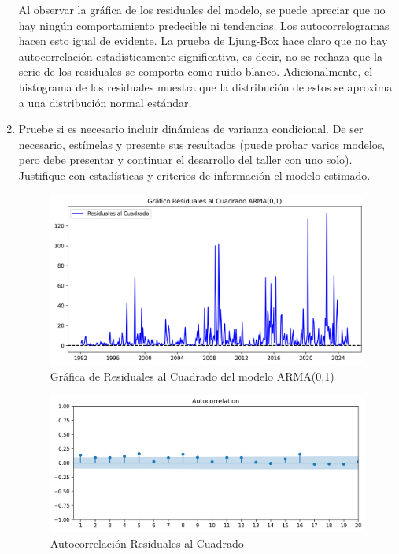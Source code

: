 \documentclass{article}
\theoremstyle{remark}
\theoremstyle{definition}
\begin{document}
\begin{enumerate}[label = \emph{\alph*})]
\begin{tcolorbox}[title=Soluci\'on 2.e]
Al observar la gráfica de los residuales del modelo, se puede apreciar que no hay ningún comportamiento predecible  ni tendencias. Los autocorrelogramas hacen esto igual de evidente. La prueba de Ljung-Box hace claro que no hay autocorrelación estadísticamente significativa, es decir, no se rechaza que la serie de los residuales se comporta como ruido blanco. Adicionalmente, el histograma de los residuales muestra que la distribución de estos se aproxima a una distribución normal estándar.
        \end{tcolorbox}
    \item {Pruebe si es necesario incluir din\'amicas de varianza condicional. De ser necesario, est\'imelas y presente sus resultados (puede probar varios modelos, pero debe presentar y continuar el desarrollo del taller con uno solo). Justifique con estad\'isticas y criterios de informaci\'on el modelo estimado.}
        \begin{tcolorbox}[title=Soluci\'on 2.f]
            \begin{figure}[H]
                \centering
                \includegraphics[width=0.9\linewidth]{output/graf_resid2.png}
                \caption{Gr\'afica de Residuales al Cuadrado del modelo ARMA(0,1)}
                \label{fig:graf_resid2}
            \end{figure}
            
            \begin{figure}[H]
                \centering
                \includegraphics[width=0.9\linewidth]{output/acf_residuales2.png}
                \caption{Autocorrelaci\'on Residuales al Cuadrado}
                \label{fig:acf_resid2}
            \end{figure}


\end{tcolorbox}
\end{enumerate}
\end{document}
